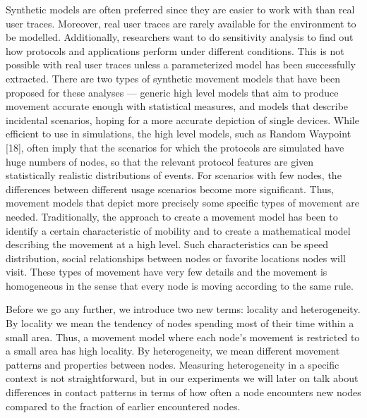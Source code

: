 Synthetic models are often preferred since they are easier to work with than real user traces. Moreover, real user traces are rarely available for the environment to be modelled. Additionally, researchers want to do sensitivity analysis to find out how protocols and applications perform under different conditions. This is not possible with real user traces unless a parameterized model has been successfully extracted. 
There are two types of synthetic movement models that have been proposed for these
analyses — generic high level models that aim to produce movement accurate enough
with statistical measures, and models that describe incidental scenarios, hoping for a
more accurate depiction of single devices.
While efficient to use in simulations, the high level models, such as Random Waypoint
[18], often imply that the scenarios for which the protocols are simulated have huge
numbers of nodes, so that the relevant protocol features are given statistically realistic
distributions of events. For scenarios with few nodes, the differences between different
usage scenarios become more significant. Thus, movement models that depict more
precisely some specific types of movement are needed.
Traditionally, the approach to create a movement model has been to identify a certain
characteristic of mobility and to create a mathematical model describing the movement
at a high level. Such characteristics can be speed distribution, social relationships
between nodes or favorite locations nodes will visit. These types of movement have
very few details and the movement is homogeneous in the sense that every node is
moving according to the same rule.

Before we go any further, we introduce two new terms: locality and heterogeneity. By
locality we mean the tendency of nodes spending most of their time within a small area.
Thus, a movement model where each node's movement is restricted to a small area has
high locality. By heterogeneity, we mean different movement patterns and properties
between nodes. Measuring heterogeneity in a specific context is not straightforward,
but in our experiments we will later on talk about differences in contact patterns in
terms of how often a node encounters new nodes compared to the fraction of earlier
encountered nodes.

